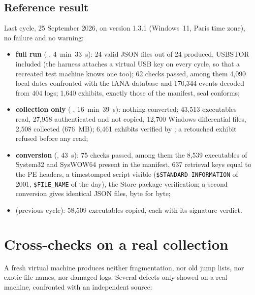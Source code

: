 \documentclass[11pt,a4paper,oneside]{report}
\begin{document}
\section{Reference result}

Last cycle, 25 September 2026, on version 1.3.1 (Windows~11, Paris time zone),
no failure and no warning:

\begin{itemize}
  \item \textbf{full run} ( , 4~min~33~s): 24 valid JSON
    files out of 24 produced, USBSTOR included (the harness attaches a virtual
    USB key on every cycle, so that a recreated test machine knows one too);
    62 checks passed, among them 4,090 local dates confronted with the IANA
    database and 170,344 events decoded from 404 logs; 1,640 exhibits, exactly
    those of the manifest, seal conforms;
  \item \textbf{collection only} (  ,
    16~min~39~s): nothing converted; 43,513 executables read, 27,958 authenticated
    and not copied, 12,700 Windows differential files, 2,508 collected
    (676~MB); 6,461 exhibits verified by ; a
    retouched exhibit refused before any read;
  \item \textbf{conversion} (, 43~s): 75 checks passed, among
    them the 8,539 executables of System32 and SysWOW64 present in the
    manifest, 637 retrieval keys equal to the PE headers, a timestomped script
    visible (\texttt{\$STANDARD\_\allowbreak INFORMATION} of 2001, \texttt{\$FILE\_NAME} of the day), the Store
    package verification; a second conversion gives identical JSON files, byte
    for byte;
  \item \textbf{} (previous cycle): 58,509 executables copied,
    each with its signature verdict.
\end{itemize}

\chapter{Cross-checks on a real collection}\label{ch:reel}

A fresh virtual machine produces neither fragmentation, nor old jump lists,
nor exotic file names, nor damaged logs. Several defects only showed on a real
machine, confronted with an independent source:
\end{document}
